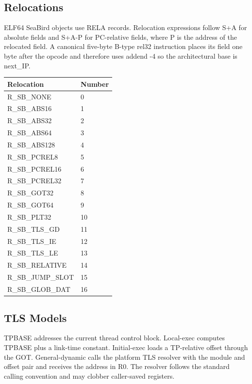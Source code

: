 \documentclass[10pt]{article}
\begin{document}
\subsection{Relocations}
ELF64 SeaBird objects use RELA records. Relocation expressions follow S+A for absolute fields and S+A-P for PC-relative fields, where P is the address of the relocated field. A canonical five-byte B-type rel32 instruction places its field one byte after the opcode and therefore uses addend -4 so the architectural base is next\_IP.
\begin{longtable}{@{}L{4.5cm}L{2cm}@{}}
\toprule Relocation & Number \\ \midrule
R\_\allowbreak{}SB\_\allowbreak{}NONE & 0 \\
R\_\allowbreak{}SB\_\allowbreak{}ABS16 & 1 \\
R\_\allowbreak{}SB\_\allowbreak{}ABS32 & 2 \\
R\_\allowbreak{}SB\_\allowbreak{}ABS64 & 3 \\
R\_\allowbreak{}SB\_\allowbreak{}ABS128 & 4 \\
R\_\allowbreak{}SB\_\allowbreak{}PCREL8 & 5 \\
R\_\allowbreak{}SB\_\allowbreak{}PCREL16 & 6 \\
R\_\allowbreak{}SB\_\allowbreak{}PCREL32 & 7 \\
R\_\allowbreak{}SB\_\allowbreak{}GOT32 & 8 \\
R\_\allowbreak{}SB\_\allowbreak{}GOT64 & 9 \\
R\_\allowbreak{}SB\_\allowbreak{}PLT32 & 10 \\
R\_\allowbreak{}SB\_\allowbreak{}TLS\_\allowbreak{}GD & 11 \\
R\_\allowbreak{}SB\_\allowbreak{}TLS\_\allowbreak{}IE & 12 \\
R\_\allowbreak{}SB\_\allowbreak{}TLS\_\allowbreak{}LE & 13 \\
R\_\allowbreak{}SB\_\allowbreak{}RELATIVE & 14 \\
R\_\allowbreak{}SB\_\allowbreak{}JUMP\_\allowbreak{}SLOT & 15 \\
R\_\allowbreak{}SB\_\allowbreak{}GLOB\_\allowbreak{}DAT & 16 \\
\bottomrule\end{longtable}
\subsection{TLS Models}

TPBASE addresses the current thread control block. Local-exec computes TPBASE plus a link-time constant. Initial-exec loads a TP-relative offset through the GOT. General-dynamic calls the platform TLS resolver with the module and offset pair and receives the address in R0. The resolver follows the standard calling convention and may clobber caller-saved registers.
\end{document}

